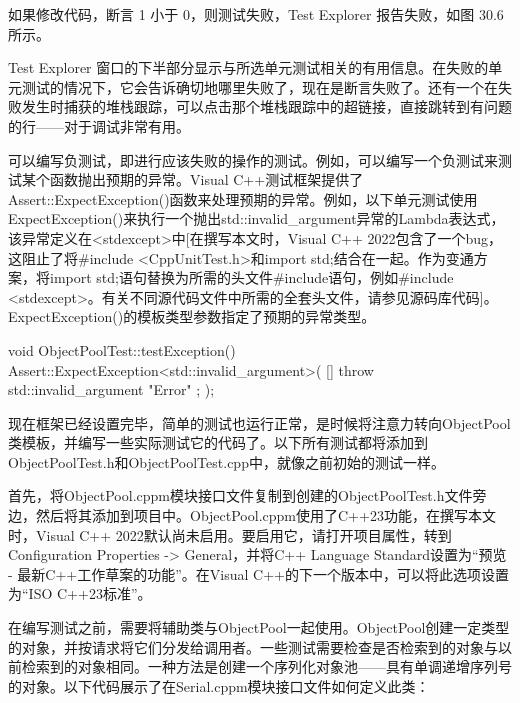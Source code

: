 
如果修改代码，断言 1 小于 0，则测试失败，Test Explorer 报告失败，如图 30.6 所示。


Test Explorer 窗口的下半部分显示与所选单元测试相关的有用信息。在失败的单元测试的情况下，它会告诉确切地哪里失败了，现在是断言失败了。还有一个在失败发生时捕获的堆栈跟踪，可以点击那个堆栈跟踪中的超链接，直接跳转到有问题的行——对于调试非常有用。


可以编写负测试，即进行应该失败的操作的测试。例如，可以编写一个负测试来测试某个函数抛出预期的异常。Visual C++测试框架提供了Assert::ExpectException()函数来处理预期的异常。例如，以下单元测试使用ExpectException()来执行一个抛出std::invalid\_argument异常的Lambda表达式，该异常定义在<stdexcept>中[在撰写本文时，Visual C++ 2022包含了一个bug，这阻止了将\#include <CppUnitTest.h>和import std;结合在一起。作为变通方案，将import std;语句替换为所需的头文件\#include语句，例如\#include <stdexcept>。有关不同源代码文件中所需的全套头文件，请参见源码库代码]。ExpectException()的模板类型参数指定了预期的异常类型。

\begin{cpp}
void ObjectPoolTest::testException()
{
    Assert::ExpectException<std::invalid_argument>(
        []{ throw std::invalid_argument { "Error" }; });
}
\end{cpp}


现在框架已经设置完毕，简单的测试也运行正常，是时候将注意力转向ObjectPool类模板，并编写一些实际测试它的代码了。以下所有测试都将添加到ObjectPoolTest.h和ObjectPoolTest.cpp中，就像之前初始的测试一样。

首先，将ObjectPool.cppm模块接口文件复制到创建的ObjectPoolTest.h文件旁边，然后将其添加到项目中。ObjectPool.cppm使用了C++23功能，在撰写本文时，Visual C++ 2022默认尚未启用。要启用它，请打开项目属性，转到Configuration Properties -> General，并将C++ Language Standard设置为“预览 - 最新C++工作草案的功能”。在Visual C++的下一个版本中，可以将此选项设置为“ISO C++23标准”。

在编写测试之前，需要将辅助类与ObjectPool一起使用。ObjectPool创建一定类型的对象，并按请求将它们分发给调用者。一些测试需要检查是否检索到的对象与以前检索到的对象相同。一种方法是创建一个序列化对象池——具有单调递增序列号的对象。以下代码展示了在Serial.cppm模块接口文件如何定义此类：

